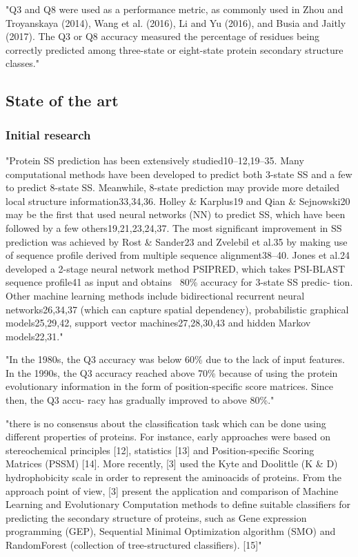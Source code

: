  "Q3 and Q8 were used as a performance metric, as commonly used in Zhou and Troyanskaya (2014), Wang et al. (2016), Li and Yu (2016), and Busia and Jaitly (2017). The Q3 or Q8 accuracy measured the percentage of residues being correctly predicted among three-state or eight-state protein secondary structure classes." \cite{Fang2017}

 \subsection{State of the art}
	\subsubsection{Initial research}
	"Protein SS prediction has been extensively studied10–12,19–35. Many computational methods have been developed to predict both 3-state SS and a few to predict 8-state SS. Meanwhile, 8-state prediction may provide more detailed local structure information33,34,36. Holley \& Karplus19 and Qian \& Sejnowski20 may be the first that used neural networks (NN) to predict SS, which have been followed by a few others19,21,23,24,37. The most significant improvement in SS prediction was achieved by Rost \& Sander23 and Zvelebil et al.35 by making use of sequence profile derived from multiple sequence alignment38–40. Jones et al.24 developed a 2-stage neural network method PSIPRED, which takes PSI-BLAST sequence profile41 as input and obtains ~80\% accuracy for 3-state SS predic- tion. Other machine learning methods include bidirectional recurrent neural networks26,34,37 (which can capture spatial dependency), probabilistic graphical models25,29,42, support vector machines27,28,30,43 and hidden Markov models22,31." \cite{Wang2016}

	"In the 1980s, the Q3 accuracy was below 60\% due to the lack of input features. In the 1990s, the Q3 accuracy reached above 70\% because of using the protein evolutionary information in the form of position-specific score matrices. Since then, the Q3 accu- racy has gradually improved to above 80\%." \cite{Fang2017}

	"there is no consensus about the classification task which can be done using different properties of proteins. For instance, early approaches were based on stereochemical principles [12], statistics [13] and Position-specific Scoring Matrices (PSSM) [14]. More recently, [3] used the Kyte and Doolittle (K \& D) hydrophobicity scale in order to represent the aminoacids of proteins. From the approach point of view, [3] present the application and comparison of Machine Learning and Evolutionary Computation methods to define suitable classifiers for predicting the secondary structure of proteins, such as Gene expression programming (GEP), Sequential Minimal Optimization algorithm (SMO) and RandomForest (collection of tree-structured classifiers). [15]" \cite{Hattori2017}

